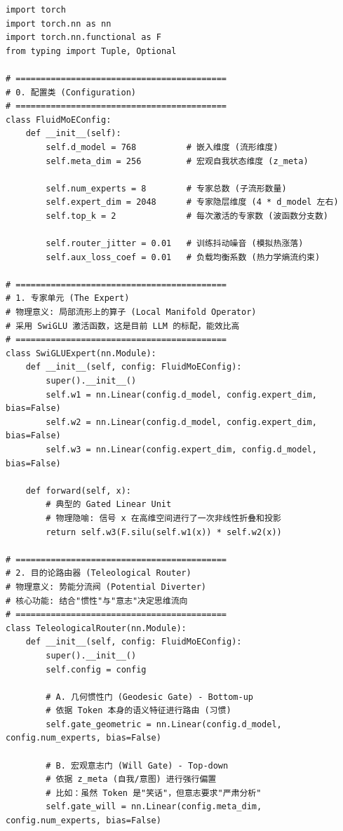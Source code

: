 \begin{lstlisting}
import torch
import torch.nn as nn
import torch.nn.functional as F
from typing import Tuple, Optional

# ==========================================
# 0. 配置类 (Configuration)
# ==========================================
class FluidMoEConfig:
    def __init__(self):
        self.d_model = 768          # 嵌入维度 (流形维度)
        self.meta_dim = 256         # 宏观自我状态维度 (z_meta)

        self.num_experts = 8        # 专家总数 (子流形数量)
        self.expert_dim = 2048      # 专家隐层维度 (4 * d_model 左右)
        self.top_k = 2              # 每次激活的专家数 (波函数分支数)

        self.router_jitter = 0.01   # 训练抖动噪音 (模拟热涨落)
        self.aux_loss_coef = 0.01   # 负载均衡系数 (热力学熵流约束)

# ==========================================
# 1. 专家单元 (The Expert)
# 物理意义: 局部流形上的算子 (Local Manifold Operator)
# 采用 SwiGLU 激活函数，这是目前 LLM 的标配，能效比高
# ==========================================
class SwiGLUExpert(nn.Module):
    def __init__(self, config: FluidMoEConfig):
        super().__init__()
        self.w1 = nn.Linear(config.d_model, config.expert_dim, bias=False)
        self.w2 = nn.Linear(config.d_model, config.expert_dim, bias=False)
        self.w3 = nn.Linear(config.expert_dim, config.d_model, bias=False)

    def forward(self, x):
        # 典型的 Gated Linear Unit
        # 物理隐喻: 信号 x 在高维空间进行了一次非线性折叠和投影
        return self.w3(F.silu(self.w1(x)) * self.w2(x))

# ==========================================
# 2. 目的论路由器 (Teleological Router)
# 物理意义: 势能分流阀 (Potential Diverter)
# 核心功能: 结合"惯性"与"意志"决定思维流向
# ==========================================
class TeleologicalRouter(nn.Module):
    def __init__(self, config: FluidMoEConfig):
        super().__init__()
        self.config = config

        # A. 几何惯性门 (Geodesic Gate) - Bottom-up
        # 依据 Token 本身的语义特征进行路由 (习惯)
        self.gate_geometric = nn.Linear(config.d_model, config.num_experts, bias=False)

        # B. 宏观意志门 (Will Gate) - Top-down
        # 依据 z_meta (自我/意图) 进行强行偏置
        # 比如：虽然 Token 是"笑话"，但意志要求"严肃分析"
        self.gate_will = nn.Linear(config.meta_dim, config.num_experts, bias=False)


\end{lstlisting}
